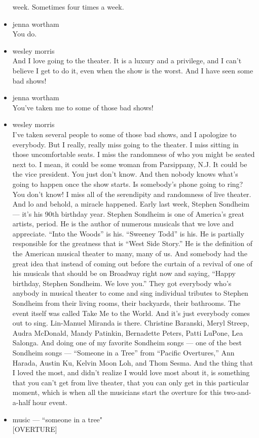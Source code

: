 \begin{itemize}
  week. Sometimes four times a week.
\item
  jenna wortham\\
  You do.
\item
  wesley morris\\
  And I love going to the theater. It is a luxury and a privilege, and I
  can't believe I get to do it, even when the show is the worst. And I
  have seen some bad shows!
\item
  jenna wortham\\
  You've taken me to some of those bad shows!
\item
  wesley morris\\
  I've taken several people to some of those bad shows, and I apologize
  to everybody. But I really, really miss going to the theater. I miss
  sitting in those uncomfortable seats. I miss the randomness of who you
  might be seated next to. I mean, it could be some woman from
  Parsippany, N.J. It could be the vice president. You just don't know.
  And then nobody knows what's going to happen once the show starts. Is
  somebody's phone going to ring? You don't know! I miss all of the
  serendipity and randomness of live theater. And lo and behold, a
  miracle happened. Early last week, Stephen Sondheim --- it's his 90th
  birthday year. Stephen Sondheim is one of America's great artists,
  period. He is the author of numerous musicals that we love and
  appreciate. ``Into the Woods'' is his. ``Sweeney Todd'' is his. He is
  partially responsible for the greatness that is ``West Side Story.''
  He is the definition of the American musical theater to many, many of
  us. And somebody had the great idea that instead of coming out before
  the curtain of a revival of one of his musicals that should be on
  Broadway right now and saying, ``Happy birthday, Stephen Sondheim. We
  love you.'' They got everybody who's anybody in musical theater to
  come and sing individual tributes to Stephen Sondheim from their
  living rooms, their backyards, their bathrooms. The event itself was
  called Take Me to the World. And it's just everybody comes out to
  sing. Lin-Manuel Miranda is there. Christine Baranski, Meryl Streep,
  Audra McDonald, Mandy Patinkin, Bernadette Peters, Patti LuPone, Lea
  Salonga. And doing one of my favorite Sondheim songs --- one of the
  best Sondheim songs --- ``Someone in a Tree'' from ``Pacific
  Overtures,'' Ann Harada, Austin Ku, Kelvin Moon Loh, and Thom Sesma.
  And the thing that I loved the most, and didn't realize I would love
  most about it, is something that you can't get from live theater, that
  you can only get in this particular moment, which is when all the
  musicians start the overture for this two-and-a-half hour event.
\item
  music --- ``someone in a tree"\\
  {[}OVERTURE{]}
\end{itemize}

